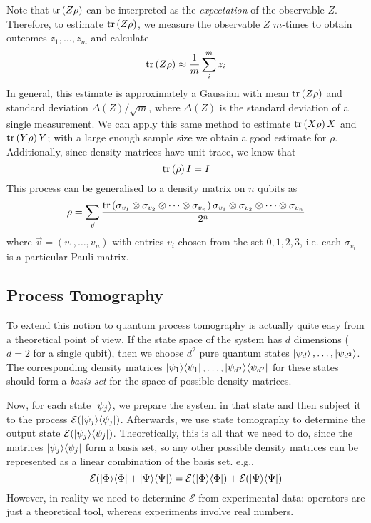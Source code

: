 Note that $\text{tr}\left(Z\rho\right)$ can be interpreted as the \textit{expectation} of the observable $Z$.
Therefore, to estimate $\text{tr}\left(Z\rho\right)$, we measure the observable $Z$ $m$-times to obtain outcomes
$z_1, \dots, z_m$ and calculate
\begin{equation}
    \text{tr}\left(Z\rho\right) \approx \frac{1}{m} \sum_i^m z_i
\end{equation}
In general, this estimate is approximately a Gaussian with mean $\text{tr}\left(Z\rho\right)$ and standard deviation
$\Delta(Z) / \sqrt{m}$, where $\Delta(Z)$ is the standard deviation of a single measurement. We can
apply this same method to estimate $\text{tr}\left(X\rho\right)X$ and $\text{tr}\left(Y\rho\right)Y$; with a large enough sample size
we obtain a good estimate for $\rho$. Additionally, since density matrices have unit trace, we know
that
\begin{equation}
    \text{tr}\left(\rho\right) I = I
\end{equation}
This process can be generalised to a density matrix on $n$ qubits as
\begin{equation}
    \rho = \sum_{\vec{v}} \frac{\text{tr}\left(\sigma_{v_1} \otimes \sigma_{v_2} \otimes \dots \otimes \sigma_{v_n}\right) \sigma_{v_1} \otimes \sigma_{v_2} \otimes \dots \otimes \sigma_{v_n}}{2^n}
\end{equation}
where $\vec{v} = \left(v_1, \dots, v_n\right)$ with entries $v_i$ chosen from the set $0, 1, 2, 3$,
i.e. each $\sigma_{v_i}$ is a particular Pauli matrix.


\subsection{Process Tomography}

To extend this notion to quantum process tomography is actually quite easy from a theoretical point
of view. If the state space of the system has $d$ dimensions ($d = 2$ for a single qubit), then we
choose $d^2$ pure quantum states $\ket{\psi_d}, \dots, \ket{\psi_{d^2}}$. The corresponding density
matrices $\ket{\psi_1}\!\bra{\psi_1}, \dots, \ket{\psi_{d^2}}\!\bra{\psi_{d^2}}$ for these states should
form a \textit{basis set} for the space of possible density matrices. 

Now, for each state $\ket{\psi_j}$, we prepare the system in that state and then subject it to the
process $\mathcal{E}(\ket{\psi_j}\!\bra{\psi_j})$. Afterwards, we use state tomography to determine the
output state $\mathcal{E}(\ket{\psi_j}\!\bra{\psi_j})$. Theoretically, this is all that we need to do,
since the matrices $\ket{\psi_j}\!\bra{\psi_j}$ form a basis set, so any other possible density
matrices can be represented as a linear combination of the basis set. e.g.,
\begin{equation}
    \mathcal{E}(\ket{\Phi}\!\bra{\Phi} + \ket{\Psi}\!\bra{\Psi}) = 
    \mathcal{E}(\ket{\Phi}\!\bra{\Phi}) + \mathcal{E}(\ket{\Psi}\!\bra{\Psi})
\end{equation}
However, in reality we need to determine $\mathcal{E}$ from experimental data: operators are just a
theoretical tool, whereas experiments involve real numbers.
